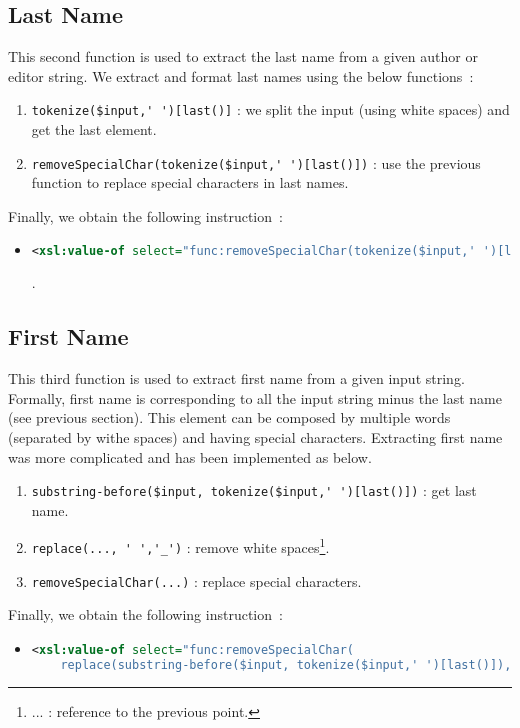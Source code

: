 \documentclass{article}
\begin{document}
  \subsection{Last Name} 
    This second function is used to extract the last name from a given author or editor string. We extract and format last names using the below functions~:
    \begin{enumerate}
      \item \verb|tokenize($input,' ')[last()]| : we split the input (using white spaces) and get the last element.
      \item \verb|removeSpecialChar(tokenize($input,' ')[last()])| : use the previous function to replace special characters in last names.
    \end{enumerate}
    Finally, we obtain the following instruction~:
    \begin{itemize}
      \item \begin{lstlisting}[language=XML]
<xsl:value-of select="func:removeSpecialChar(tokenize($input,' ')[last()])"/>\end{lstlisting}.
    \end{itemize}

  \subsection{First Name} 
    This third function is used to extract first name from a given input string. Formally, first name is corresponding to all the input string minus the last name (see previous section). This element can be composed by multiple words (separated by withe spaces) and having special characters. Extracting first name was more complicated and has been implemented as below.
    \begin{enumerate}
      \item \verb|substring-before($input, tokenize($input,' ')[last()])| : get last name.
      \item \verb|replace(..., ' ','_')| : remove white spaces\footnote{ ... : reference to the previous point.}.
      \item \verb|removeSpecialChar(...)| : replace special characters.
    \end{enumerate}
    Finally, we obtain the following instruction~:
    \begin{itemize}
      \item \begin{lstlisting}[language=XML]
<xsl:value-of select="func:removeSpecialChar(
    replace(substring-before($input, tokenize($input,' ')[last()]), ' ' ,'_'))"/>\end{lstlisting}
    \end{itemize}
\end{document}
